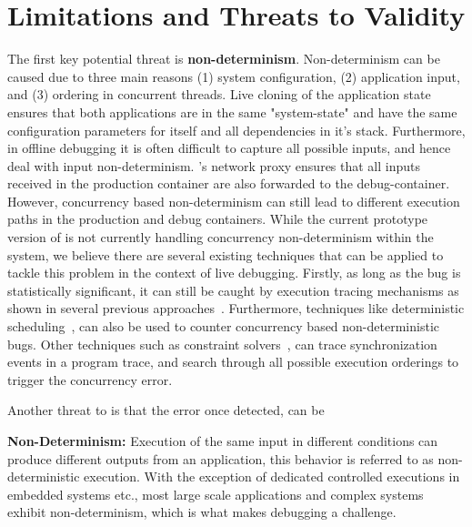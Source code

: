 \section{Limitations and Threats to Validity}
\label{sec:limitation}

The first key potential threat is \textbf{non-determinism}. 
Non-determinism can be caused due to three main reasons (1) system configuration, (2) application input, and (3) ordering in concurrent threads.
Live cloning of the application state ensures that both applications are in the same "system-state" and have the same configuration parameters for itself and all dependencies in it's stack.
Furthermore, in offline debugging it is often difficult to capture all possible inputs, and hence deal with input non-determinism.
\parikshan's network proxy ensures that all inputs received in the production container are also forwarded to the debug-container.
However, concurrency based non-determinism can still lead to different execution paths in the production and debug containers.
While the current prototype version of \parikshan is not currently handling concurrency non-determinism within the system, we believe there are several existing techniques that can be applied to tackle this problem in the context of live debugging. 
Firstly, as long as the bug is statistically significant, it can still be caught by execution tracing mechanisms as shown in several previous approaches~\cite{statistical}.
Furthermore, techniques like deterministic scheduling~\cite{deterministicScheduling}, can also be used to counter concurrency based non-deterministic bugs.
Other techniques such as constraint solvers~\cite{DPOR}, can trace synchronization events in a program trace, and search through all possible execution orderings to trigger the concurrency error.


Another threat to \parikshan is that the error once detected, can be 
\iffalse

\textbf{Non-Determinism: } 
Execution of the same input in different conditions can produce different outputs from an application, this behavior is referred to as non-deterministic execution.
With the exception of dedicated controlled executions in embedded systems etc., most large scale applications and complex systems exhibit non-determinism, which is what makes debugging a challenge.

